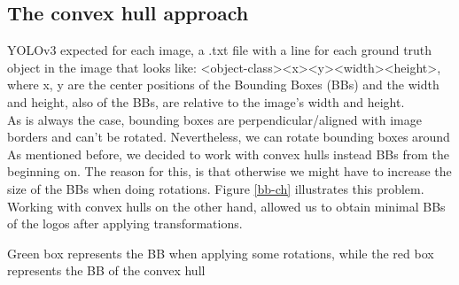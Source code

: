 \documentclass[a4paper]{article}
\begin{document}
\subsection{The convex hull approach}
YOLOv3 expected for each image, a .txt file with a line for each ground truth object in the image that looks like:
<object-class><x><y><width><height>, where x, y are the center positions of the Bounding Boxes (BBs) and the width and height, also of the BBs, are relative to the image's width and height. \\
As is always the case, bounding boxes are perpendicular/aligned with image borders and can't be rotated. Nevertheless, we can rotate bounding boxes around 
As mentioned before, we decided to work with convex hulls instead BBs from the beginning on.  The reason for this, is that otherwise we might have to increase the size of the BBs when doing rotations. Figure \ref{bb-ch} illustrates this problem.   Working with convex hulls on the other hand,  allowed us to obtain minimal BBs of the logos after applying transformations.

\begin{minipage}{\columnwidth}
\makeatletter
\newcommand{\@captype}{figure}
\makeatother
\centering
\captionsetup[subfigure]{labelformat=empty}
\caption{Green box represents the BB when applying some rotations, while the red box represents the BB of the convex hull}
\label{bb-ch}
\end{minipage}
\end{document}
